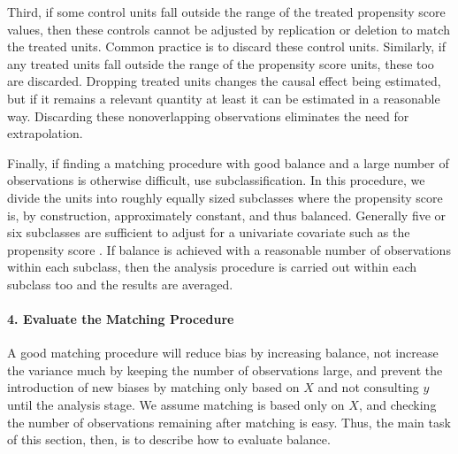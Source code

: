 \documentclass[11pt,titlepage]{article}
\begin{document}
Third, if some control units fall outside the range of the treated
propensity score values, then these controls cannot be adjusted by
replication or deletion to match the treated units.  Common practice
is to discard these control units.  Similarly, if any treated units
fall outside the range of the propensity score units, these too are
discarded.  Dropping treated units changes the causal effect being
estimated, but if it remains a relevant quantity at least it can be
estimated in a reasonable way.  Discarding these nonoverlapping
observations eliminates the need for extrapolation.

Finally, if finding a matching procedure with good balance and a large
number of observations is otherwise difficult, use subclassification.
In this procedure, we divide the units into roughly equally sized
subclasses where the propensity score is, by construction,
approximately constant, and thus balanced.  Generally five or six
subclasses are sufficient to adjust for a univariate covariate such as
the propensity score \citep{Cochran68,RosRub84}.  If balance is
achieved with a reasonable number of observations within each
subclass, then the analysis procedure is carried out within each
subclass too and the results are averaged.

\paragraph{4. Evaluate the Matching Procedure}
A good matching procedure will reduce bias by increasing balance, not
increase the variance much by keeping the number of observations
large, and prevent the introduction of new biases by matching only
based on $X$ and not consulting $y$ until the analysis stage.  We
assume matching is based only on $X$, and checking the number of
observations remaining after matching is easy.  Thus, the main task of
this section, then, is to describe how to evaluate balance.
\end{document}
